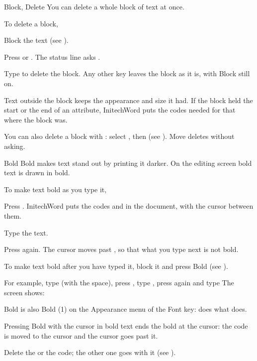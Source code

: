 \begin{Feature}{Block, Delete}
You can delete a whole block of text at once.

To delete a block,
\begin{WPSteps}
\item Block the text (see ).
\item Press  or .  The status line asks
.
\item Type  to delete the block.  Any other key leaves the block as
it is, with Block still on.
\end{WPSteps}

\Notes
{}
Text outside the block keeps the appearance and size it had.  If the block
held the start or the end of an attribute, InitechWord puts the codes needed
for that where the block was.

You can also delete a block with : select ,
then  (see ).  Move deletes without asking.

\end{Feature}

\begin{Feature}{Bold}
Bold makes text stand out by printing it darker.  On the editing screen
bold text is drawn in bold.

To make text bold as you type it,
\begin{WPSteps}
\item Press .  InitechWord puts the codes \Code{[BOLD]} and
\Code{[bold]} in the document, with the cursor between them.
\item Type the text.
\item Press  again.  The cursor moves past \Code{[bold]}, so
that what you type next is not bold.
\end{WPSteps}
\begin{WPNote}To make text bold after you have typed it, block it and press
Bold (see ).\end{WPNote}

For example, type (with the space), press
, type , press  again and type
  The screen shows:
\EndReplay

\Notes
{}
Bold is also Bold (1) on the Appearance menu of the Font key: 
does what  does.

Pressing Bold with the cursor in bold text ends the bold at the cursor: the
\Code{[bold]} code is moved to the cursor and the cursor goes past it.

Delete the \Code{[BOLD]} or the \Code{[bold]} code; the other one goes with
it (see ).

\end{Feature}
